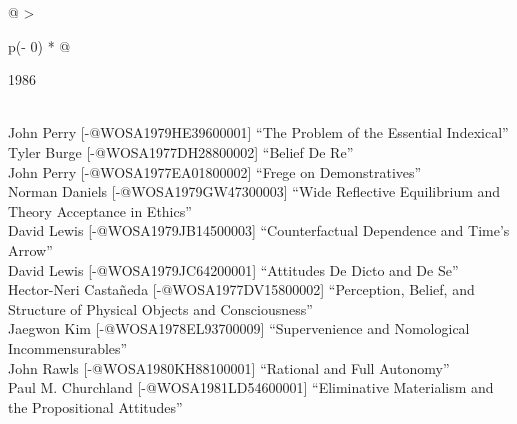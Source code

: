 \documentclass[
  10pt,
  letterpaper,
  DIV=11,
  numbers=noendperiod,
  twoside]{scrartcl}
\begin{document}
\begin{longtable}[]{@{}
  >{\raggedright\arraybackslash}p{(\columnwidth - 0\tabcolsep) * }@{}}

\caption{\label{tbl-top-ten-1977}Most cited articles published less than
ten years ago as of 1986.}

\tabularnewline

\toprule\noalign{}
\begin{minipage}[b]{\linewidth}\raggedright
1986
\end{minipage} \\
\midrule\noalign{}
\endhead
\bottomrule\noalign{}
\endlastfoot
John Perry {[}-@WOSA1979HE39600001{]} ``The Problem of the Essential
Indexical'' \\
Tyler Burge {[}-@WOSA1977DH28800002{]} ``Belief De Re'' \\
John Perry {[}-@WOSA1977EA01800002{]} ``Frege on Demonstratives'' \\
Norman Daniels {[}-@WOSA1979GW47300003{]} ``Wide Reflective Equilibrium
and Theory Acceptance in Ethics'' \\
David Lewis {[}-@WOSA1979JB14500003{]} ``Counterfactual Dependence and
Time's Arrow'' \\
David Lewis {[}-@WOSA1979JC64200001{]} ``Attitudes De Dicto and De
Se'' \\
Hector-Neri Castañeda {[}-@WOSA1977DV15800002{]} ``Perception, Belief,
and Structure of Physical Objects and Consciousness'' \\
Jaegwon Kim {[}-@WOSA1978EL93700009{]} ``Supervenience and Nomological
Incommensurables'' \\
John Rawls {[}-@WOSA1980KH88100001{]} ``Rational and Full Autonomy'' \\
Paul M. Churchland {[}-@WOSA1981LD54600001{]} ``Eliminative Materialism
and the Propositional Attitudes'' \\

\end{longtable}
\end{document}
